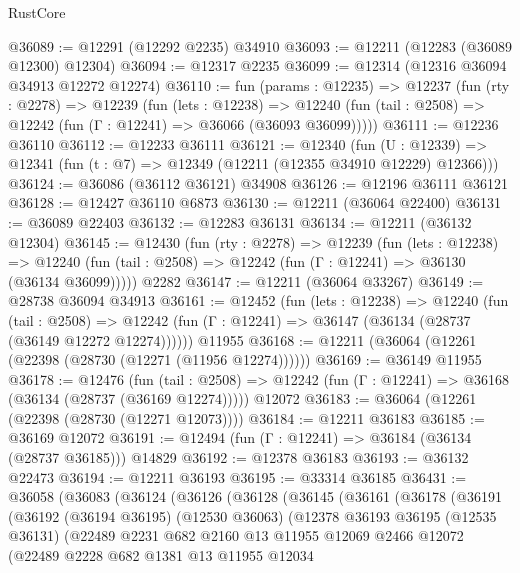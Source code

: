 \begin{lexlean}{RustCore}
\begin{coremodule}
@36089 := @12291 (@12292 @2235) @34910
@36093 := @12211 (@12283 (@36089 @12300) @12304)
@36094 := @12317 @2235
@36099 := @12314 (@12316 @36094 @34913 @12272 @12274)
@36110 := fun (params : @12235) =>
  @12237
    (fun (rty : @2278) =>
    @12239
      (fun (lets : @12238) =>
      @12240 (fun (tail : @2508) => @12242 (fun (Γ : @12241) => @36066 (@36093 @36099)))))
@36111 := @12236 @36110
@36112 := @12233 @36111
@36121 := @12340
    (fun (U : @12339) => @12341 (fun (t : @7) => @12349 (@12211 (@12355 @34910 @12229) @12366)))
@36124 := @36086 (@36112 @36121) @34908
@36126 := @12196 @36111 @36121
@36128 := @12427 @36110 @6873
@36130 := @12211 (@36064 @22400)
@36131 := @36089 @22403
@36132 := @12283 @36131
@36134 := @12211 (@36132 @12304)
@36145 := @12430
    (fun (rty : @2278) =>
    @12239
      (fun (lets : @12238) =>
      @12240 (fun (tail : @2508) => @12242 (fun (Γ : @12241) => @36130 (@36134 @36099)))))
    @2282
@36147 := @12211 (@36064 @33267)
@36149 := @28738 @36094 @34913
@36161 := @12452
    (fun (lets : @12238) =>
    @12240
      (fun (tail : @2508) =>
      @12242 (fun (Γ : @12241) => @36147 (@36134 (@28737 (@36149 @12272 @12274))))))
    @11955
@36168 := @12211 (@36064 (@12261 (@22398 (@28730 (@12271 (@11956 @12274))))))
@36169 := @36149 @11955
@36178 := @12476
    (fun (tail : @2508) => @12242 (fun (Γ : @12241) => @36168 (@36134 (@28737 (@36169 @12274)))))
    @12072
@36183 := @36064 (@12261 (@22398 (@28730 (@12271 @12073))))
@36184 := @12211 @36183
@36185 := @36169 @12072
@36191 := @12494 (fun (Γ : @12241) => @36184 (@36134 (@28737 @36185))) @14829
@36192 := @12378 @36183
@36193 := @36132 @22473
@36194 := @12211 @36193
@36195 := @33314 @36185
@36431 := @36058
    (@36083
      (@36124
        (@36126
          (@36128
            (@36145
              (@36161
                (@36178
                  (@36191
                    (@36192
                      (@36194 @36195)
                      (@12530 @36063)
                      (@12378
                        @36193
                        @36195
                        (@12535 @36131)
                        (@22489
                          @2231
                          @682
                          @2160
                          @13
                          @11955
                          @12069
                          @2466
                          @12072
                          (@22489
                            @2228
                            @682
                            @1381
                            @13
                            @11955
                            @12034

\end{coremodule}
\end{lexlean}
